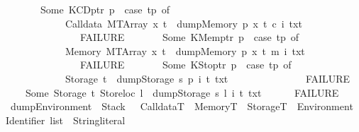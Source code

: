 \begin{isabellebody}
\ \ \ \ \ \ {\isacharbar}{\kern0pt}\ Some\ {\isacharparenleft}{\kern0pt}KCDptr\ p{\isacharparenright}{\kern0pt}\ {\isasymRightarrow}\ {\isacharparenleft}{\kern0pt}case\ tp\ of\isanewline
\ \ \ \ \ \ \ \ \ \ \ \ Calldata\ {\isacharparenleft}{\kern0pt}MTArray\ x\ t{\isacharparenright}{\kern0pt}\ {\isasymRightarrow}\ dump\isactrlsub M\isactrlsub e\isactrlsub m\isactrlsub o\isactrlsub r\isactrlsub y\ p\ x\ t\ c\ i\ txt\isanewline
\ \ \ \ \ \ \ \ \ \ \ \ {\isacharbar}{\kern0pt}\ {\isacharunderscore}{\kern0pt}\ {\isasymRightarrow}\ FAILURE{\isacharparenright}{\kern0pt}\isanewline
\ \ \ \ \ \ {\isacharbar}{\kern0pt}\ Some\ {\isacharparenleft}{\kern0pt}KMemptr\ p{\isacharparenright}{\kern0pt}\ {\isasymRightarrow}\ {\isacharparenleft}{\kern0pt}case\ tp\ of\isanewline
\ \ \ \ \ \ \ \ \ \ \ \ Memory\ {\isacharparenleft}{\kern0pt}MTArray\ x\ t{\isacharparenright}{\kern0pt}\ {\isasymRightarrow}\ dump\isactrlsub M\isactrlsub e\isactrlsub m\isactrlsub o\isactrlsub r\isactrlsub y\ p\ x\ t\ m\ i\ txt\isanewline
\ \ \ \ \ \ \ \ \ \ \ \ {\isacharbar}{\kern0pt}\ {\isacharunderscore}{\kern0pt}\ {\isasymRightarrow}\ FAILURE{\isacharparenright}{\kern0pt}\isanewline
\ \ \ \ \ \ {\isacharbar}{\kern0pt}\ Some\ {\isacharparenleft}{\kern0pt}KStoptr\ p{\isacharparenright}{\kern0pt}\ {\isasymRightarrow}\ {\isacharparenleft}{\kern0pt}case\ tp\ of\isanewline
\ \ \ \ \ \ \ \ \ \ \ \ Storage\ t\ {\isasymRightarrow}\ dump\isactrlsub S\isactrlsub t\isactrlsub o\isactrlsub r\isactrlsub a\isactrlsub g\isactrlsub e\ s\ p\ i\ t\ txt\isanewline
\ \ \ \ \ \ \ \ \ \ \ \ {\isacharbar}{\kern0pt}\ {\isacharunderscore}{\kern0pt}\ {\isasymRightarrow}\ FAILURE{\isacharparenright}{\kern0pt}{\isacharparenright}{\kern0pt}\isanewline
\ \ \ {\isacharbar}{\kern0pt}\ Some\ {\isacharparenleft}{\kern0pt}Storage\ t{\isacharcomma}{\kern0pt}\ Storeloc\ l{\isacharparenright}{\kern0pt}\ {\isasymRightarrow}\ dump\isactrlsub S\isactrlsub t\isactrlsub o\isactrlsub r\isactrlsub a\isactrlsub g\isactrlsub e\ s\ l\ i\ t\ txt\isanewline
\ \ \ {\isacharbar}{\kern0pt}\ {\isacharunderscore}{\kern0pt}\ {\isasymRightarrow}\ FAILURE\isanewline
{\isacharparenright}{\kern0pt}{\isachardoublequoteclose}\isanewline
\isanewline
{}\isamarkupfalse%
\ dump\isactrlsub E\isactrlsub n\isactrlsub v\isactrlsub i\isactrlsub r\isactrlsub o\isactrlsub n\isactrlsub m\isactrlsub e\isactrlsub n\isactrlsub t\ {\isacharcolon}{\kern0pt}{\isacharcolon}{\kern0pt}\ {\isachardoublequoteopen}Stack\ \ {\isasymRightarrow}\ CalldataT\ {\isasymRightarrow}\ MemoryT\ {\isasymRightarrow}\ StorageT\ {\isasymRightarrow}\ Environment\ {\isasymRightarrow}\ Identifier\ list\ {\isasymRightarrow}\ String{\isachardot}{\kern0pt}literal{\isachardoublequoteclose}\ \isanewline

\end{isabellebody}
